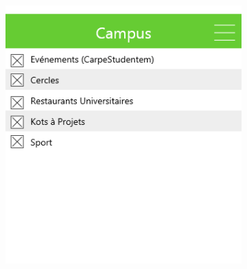 \documentclass{eplmastersthesis}
\begin{document}
\begin{figure}[H]
    \centering
\begin{subfigure}[b]{0.3\textwidth}
        \includegraphics[width=\textwidth]{Images/InVision/menucampus.png}
    \end{subfigure}
    ~ %
    \begin{subfigure}[b]{0.3\textwidth}

\end{subfigure}
\end{figure}
\end{document}
